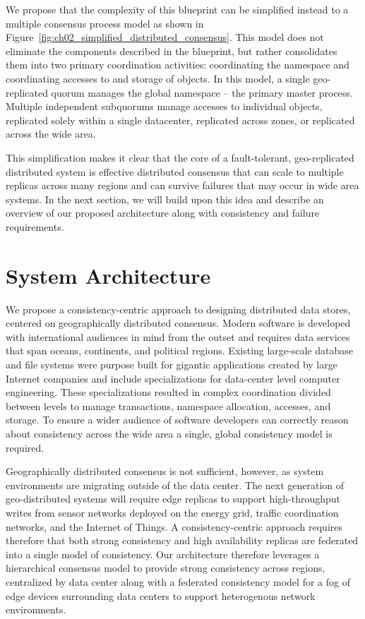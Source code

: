 We propose that the complexity of this blueprint can be simplified instead to a multiple consensus process model as shown in Figure~\ref{fig:ch02_simplified_distributed_consensus}.
This model does not eliminate the components described in the blueprint, but rather consolidates them into two primary coordination activities: coordinating the namespace and coordinating accesses to and storage of objects.
In this model, a single geo-replicated quorum manages the global namespace -- the primary master process.
Multiple independent subquorums manage accesses to individual objects, replicated solely within a single datacenter, replicated across zones, or replicated across the wide area.

This simplification makes it clear that the core of a fault-tolerant, geo-replicated distributed system is effective distributed consensus that can scale to multiple replicas across many regions and can survive failures that may occur in wide area systems.
In the next section, we will build upon this idea and describe an overview of our proposed architecture along with consistency and failure requirements.

\section{System Architecture}
\label{ch02_architecture}

We propose a consistency-centric approach to designing distributed data stores, centered on geographically distributed consensus.
Modern software is developed with international audiences in mind from the outset and requires data services that span oceans, continents, and political regions.
Existing large-scale database and file systems were purpose built for gigantic applications created by large Internet companies and include specializations for data-center level computer engineering.
These specializations resulted in complex coordination divided between levels to manage transactions, namespace allocation, accesses, and storage.
To ensure a wider audience of software developers can correctly reason about consistency across the wide area a single, global consistency model is required.

Geographically distributed consensus is not sufficient, however, as system environments are migrating outside of the data center.
The next generation of geo-distributed systems will require edge replicas to support high-throughput writes from sensor networks deployed on the energy grid, traffic coordination networks, and the Internet of Things.
A consistency-centric approach requires therefore that both strong consistency and high availability replicas are federated into a single model of consistency.
Our architecture therefore leverages a hierarchical consensus model to provide strong consistency across regions, centralized by data center along with a federated consistency model for a fog of edge devices surrounding data centers to support heterogenous network environments.


